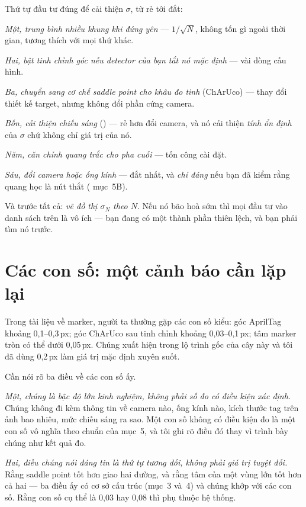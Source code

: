 \documentclass[../../marker.tex]{subfiles}
\begin{document}
\begin{cannho}
Thứ tự đầu tư đúng để cải thiện \(\sigma\), từ rẻ tới đắt:

\emph{Một, trung bình nhiều khung khi đứng yên} --- \(1/\sqrt{N}\), không tốn gì ngoài thời gian, tương thích với mọi thứ khác.

\emph{Hai, bật tinh chỉnh góc nếu detector của bạn tắt nó mặc định} --- vài dòng cấu hình.

\emph{Ba, chuyển sang cơ chế saddle point cho khâu đo tinh} (ChArUco) --- thay đổi thiết kế target, nhưng không đổi phần cứng camera.

\emph{Bốn, cải thiện chiếu sáng} () --- rẻ hơn đổi camera, và nó cải thiện \emph{tính ổn định} của \(\sigma\) chứ không chỉ giá trị của nó.

\emph{Năm, căn chỉnh quang trắc cho pha cuối} --- tốn công cài đặt.

\emph{Sáu, đổi camera hoặc ống kính} --- đắt nhất, và \emph{chỉ đáng} nếu bạn đã kiểm rằng quang học là nút thắt ( mục~5B).

Và trước tất cả: \emph{vẽ đồ thị \(\sigma_N\) theo \(N\)}. Nếu nó bão hoà sớm thì mọi đầu tư vào danh sách trên là vô ích --- bạn đang có một thành phần thiên lệch, và bạn phải tìm nó trước.
\end{cannho}

\section{Các con số: một cảnh báo cần lặp lại}

Trong tài liệu về marker, người ta thường gặp các con số kiểu: góc AprilTag khoảng 0,1--0,3\,px; góc ChArUco sau tinh chỉnh khoảng 0,03--0,1\,px; tâm marker tròn có thể dưới 0,05\,px. Chúng xuất hiện trong lộ trình gốc của cây này và tôi đã dùng 0,2\,px làm giá trị mặc định xuyên suốt.

Cần nói rõ ba điều về các con số ấy.

\emph{Một, chúng là bậc độ lớn kinh nghiệm, không phải số đo có điều kiện xác định.} Chúng không đi kèm thông tin về camera nào, ống kính nào, kích thước tag trên ảnh bao nhiêu, mức chiếu sáng ra sao. Một con số không có điều kiện đo là một con số vô nghĩa theo chuẩn của  mục~5, và tôi ghi rõ điều đó thay vì trình bày chúng như kết quả đo.

\emph{Hai, điều chúng nói đáng tin là thứ tự tương đối, không phải giá trị tuyệt đối.} Rằng saddle point tốt hơn giao hai đường, và rằng tâm của một vùng lớn tốt hơn cả hai --- ba điều ấy có cơ sở cấu trúc (mục~3 và~4) và chúng khớp với các con số. Rằng con số cụ thể là 0,03 hay 0,08 thì phụ thuộc hệ thống.
\end{document}
